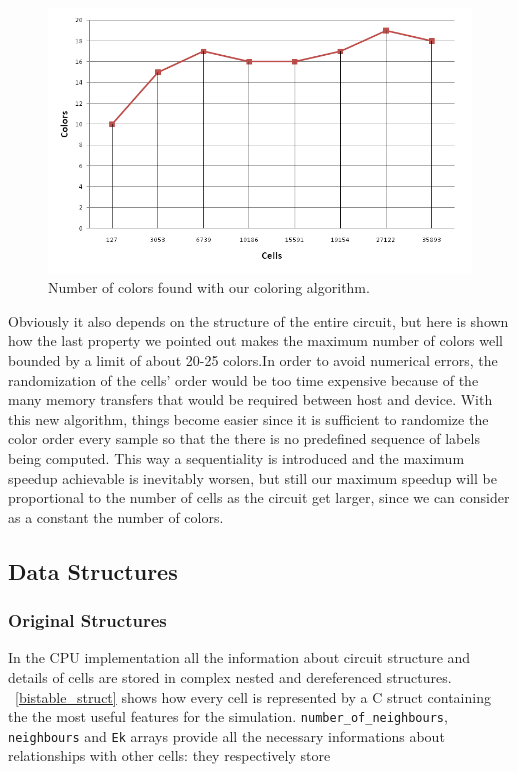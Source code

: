 \begin{figure}[h!tb]
				\centering
				\includegraphics[scale=0.5]{img/color_table.png}
				\caption{Number of colors found with our coloring algorithm.}
				\label{fig:color_table}
\end{figure}
Obviously it also depends on the structure of the entire circuit, but here is shown how the last property we pointed out makes the 
maximum number of colors well bounded by a limit of about 20-25 colors.\newline In order to avoid numerical errors, the randomization 
of the cells' order would be too time expensive because of the many memory transfers that would be required between host and device. 
With this new algorithm, things become easier since it is sufficient to randomize the color order every sample so that the there is no
 predefined sequence of labels being computed.\newline
This way a sequentiality is introduced and the maximum speedup achievable is inevitably worsen, but still our maximum speedup will be 
proportional to the number of cells as the circuit get larger, since we can consider as a constant the number of colors.

\subsection{Data Structures}
\subsubsection{Original Structures}
In the CPU implementation all the information about circuit structure and details of cells are stored in complex nested and dereferenced
 structures. \lstlistingname~\ref{bistable_struct} shows how every cell is represented by a C struct containing the the most useful 
features for the simulation. \texttt{number_of_neighbours}, \texttt{neighbours} and \texttt{Ek} arrays provide all the necessary 
informations about relationships with other cells: they respectively store

